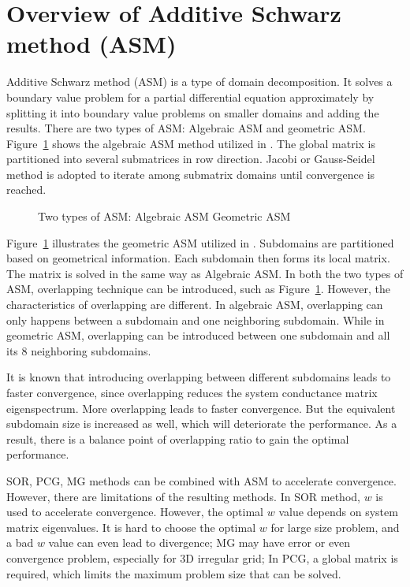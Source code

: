 \documentclass{sig-alternate}
\begin{document}
\section{Overview of Additive Schwarz method (ASM)}	
	Additive Schwarz method (ASM) is a type of domain decomposition. It solves a boundary value problem for a partial 
	differential equation approximately by splitting it into boundary value problems on smaller domains and adding the results.
	There are two types of ASM: Algebraic ASM and geometric ASM. 
	Figure~\ref{Fig2} shows the algebraic ASM method utilized in \cite{kaisun}. The global matrix
	is partitioned into several submatrices in row direction. Jacobi or Gauss-Seidel method is adopted to iterate among 
	submatrix domains until convergence is reached.
	\begin{figure}[htbp]
	  \caption{Two types of ASM: 
	   Algebraic ASM
	   Geometric ASM}
	  \label{Fig2}
	\end{figure}
	Figure~\ref{Fig2} illustrates the geometric ASM utilized in \cite{Zhongyu}. Subdomains are partitioned based on
	geometrical information. Each subdomain then forms its local matrix. The matrix is
	solved in the same way as Algebraic ASM. In both the two types of ASM, overlapping technique can be introduced, such as 
	Figure~\ref{Fig2}. However, the characteristics of overlapping are different.
	In algebraic ASM, overlapping can only happens between a subdomain and one neighboring subdomain. While in 
	geometric ASM, overlapping can be introduced between one subdomain and all its 8 neighboring subdomains.
	
	It is known that introducing overlapping between different subdomains leads to faster convergence, 
	since overlapping reduces the system conductance matrix eigenspectrum\cite{Klawonn, Taopeng}. More overlapping leads to faster 
	convergence.
	But the equivalent subdomain size is increased as well, which will deteriorate the performance. As a result, there is a 
	balance point of overlapping ratio to gain the optimal performance.

	SOR, PCG, MG methods can be combined with ASM to accelerate convergence. However, there are limitations of the resulting
	methods. In SOR method, $w$ is used to accelerate convergence. However, the optimal $w$ value depends on system matrix 
	eigenvalues. It is hard to choose the optimal $w$ for large
	size problem, and a bad $w$ value can even lead to divergence; MG may have
	error or even convergence problem, especially for 3D irregular grid; In PCG, a global
	matrix is required, which limits the maximum problem size that can be solved.
\end{document}
